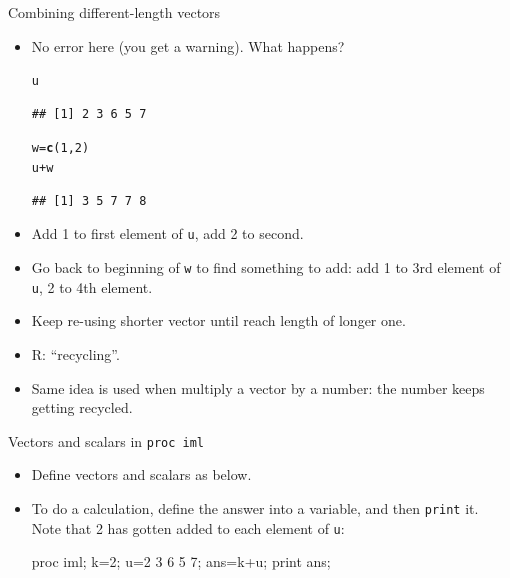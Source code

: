 \documentclass[unknownkeysallowed]{beamer}\usepackage[]{graphicx}\usepackage[]{color}
\makeatletter
\newcommand{\hlnum}[1]{\textcolor[rgb]{0.686,0.059,0.569}{#1}}%
\newcommand{\hlopt}[1]{\textcolor[rgb]{0,0,0}{#1}}%
\newcommand{\hlstd}[1]{\textcolor[rgb]{0.345,0.345,0.345}{#1}}%
\newcommand{\hlkwb}[1]{\textcolor[rgb]{0.69,0.353,0.396}{#1}}%
\newcommand{\hlkwd}[1]{\textcolor[rgb]{0.737,0.353,0.396}{\textbf{#1}}}%
\newenvironment{kframe}{%
 \def\at@end@of@kframe{}%
 \ifinner\ifhmode%
  \def\at@end@of@kframe{\end{minipage}}%
  \begin{minipage}{\columnwidth}%
 \fi\fi%
 \def\FrameCommand##1{\hskip\@totalleftmargin \hskip-\fboxsep
 \colorbox{shadecolor}{##1}\hskip-\fboxsep
     \hskip-\linewidth \hskip-\@totalleftmargin \hskip\columnwidth}%
 \MakeFramed {\advance\hsize-\width
   \@totalleftmargin\z@ \linewidth\hsize
   \@setminipage}}%
 {\par\unskip\endMakeFramed%
 \at@end@of@kframe}
\newenvironment{knitrout}{}{} %
\makeatother
\begin{document}
\begin{frame}[fragile]{Combining different-length vectors}

  \begin{itemize}
  \item No error here (you get a warning). What happens?
\begin{knitrout}
\color{fgcolor}\begin{kframe}
\begin{alltt}
\hlstd{u}
\end{alltt}
\begin{verbatim}
## [1] 2 3 6 5 7
\end{verbatim}
\begin{alltt}
\hlstd{w}\hlkwb{=}\hlkwd{c}\hlstd{(}\hlnum{1}\hlstd{,}\hlnum{2}\hlstd{)}
\hlstd{u}\hlopt{+}\hlstd{w}
\end{alltt}
\begin{verbatim}
## [1] 3 5 7 7 8
\end{verbatim}
\end{kframe}
\end{knitrout}
\item Add 1 to first element of \texttt{u}, add 2 to second.
\item Go back to beginning of \texttt{w} to find something to add: add
  1 to 3rd element of \texttt{u}, 2 to 4th element.
\item Keep re-using shorter vector until reach length of longer one.
\item R: ``recycling''.
\item Same idea is used when multiply a vector by a number: the number
  keeps getting recycled.

  \end{itemize}
  
\end{frame}

\begin{frame}[fragile]{Vectors and scalars in \texttt{proc iml}}
  
  \begin{itemize}
  \item Define vectors and scalars as below.
    \item To do a calculation, define the answer into a variable, and
      then \texttt{print} it. Note that 2 has gotten added to each
      element of \texttt{u}:
    
    \begin{Sascode}[store=ima]
proc iml;
  k=2;
  u={2 3 6 5 7};
  ans=k+u;
  print ans;
    \end{Sascode}
    
      
  \end{itemize}
  
\end{frame}
\end{document}
